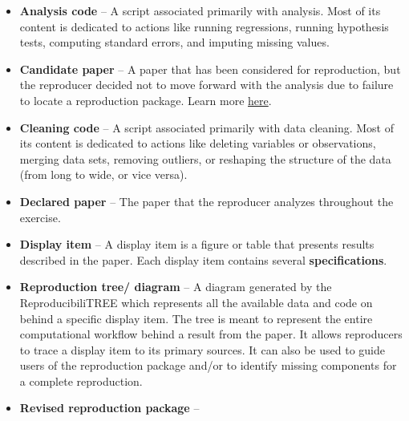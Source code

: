 \documentclass[
]{book}
\providecommand{\tightlist}{%
  \setlength{\itemsep}{0pt}\setlength{\parskip}{0pt}}
\begin{document}
\begin{itemize}
\tightlist
\item
  \textbf{Analysis code} -- A script associated primarily with analysis. Most of its content is dedicated to actions like running regressions, running hypothesis tests, computing standard errors, and imputing missing values.\\
\item
  \textbf{Candidate paper} -- A paper that has been considered for reproduction, but the reproducer decided not to move forward with the analysis due to failure to locate a reproduction package. Learn more \href{https://bitss.github.io/ACRE/scoping.html\#from-candidate-to-declared-paper}{here}.
\item
  \textbf{Cleaning code} -- A script associated primarily with data cleaning. Most of its content is dedicated to actions like deleting variables or observations, merging data sets, removing outliers, or reshaping the structure of the data (from long to wide, or vice versa).\\
\item
  \textbf{Declared paper} -- The paper that the reproducer analyzes throughout the exercise.
\item
  \textbf{Display item} -- A display item is a figure or table that presents results described in the paper. Each display item contains several \textbf{specifications}. \\
\item
  \textbf{Reproduction tree/ diagram} -- A diagram generated by the ReproducibiliTREE which represents all the available data and code on behind a specific display item. The tree is meant to represent the entire computational workflow behind a result from the paper. It allows reproducers to trace a display item to its primary sources. It can also be used to guide users of the reproduction package and/or to identify missing components for a complete reproduction.
\item
  \textbf{Revised reproduction package} --
\end{itemize}

  
\end{document}

